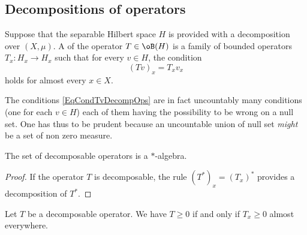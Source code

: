 					\subsection{Decompositions of operators}



Suppose that the separable Hilbert space $H$ is provided with a decomposition over $(X,\mu)$. A  of the operator $T\in \oB(H)$ is a family of bounded operators $T_x\colon H_x\to H_x$ such that for every $v\in H$, the condition
\begin{equation}		\label{EqCondTvDecompOps}
	(Tv)_x=T_xv_x
\end{equation}
holds for almost every $x\in X$. 

\begin{remark}
The conditions \ref{EqCondTvDecompOps} are in fact uncountably many conditions (one for each $v\in H$) each of them having the possibility to be wrong on a null set. One has thus to be prudent because an uncountable union of null set \emph{might} be a set of non zero measure.
\end{remark}


\begin{lemma}
The set of decomposable operators is a $*$-algebra.
\end{lemma}

\begin{proof}
If the operator $T$ is decomposable, the rule $(T^*)_x=(T_x)^*$ provides a decomposition of $T^*$.
\end{proof}

\begin{lemma}
Let $T$ be a decomposable operator. We have $T\geq 0$ if and only if $T_x\geq 0$ almost everywhere.
\end{lemma}


